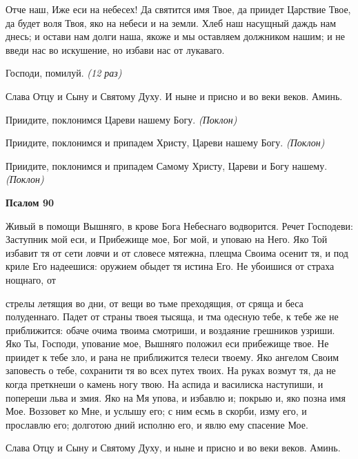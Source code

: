    Отче наш, Иже еси на небесех! Да святится имя Твое, да приидет
Царствие Твое, да будет воля Твоя, яко на небеси и на земли. Хлеб наш
насущный даждь нам днесь; и остави нам долги наша, якоже и мы оставляем
должником нашим; и не введи нас во искушение, но избави нас от
лукаваго.



   Господи, помилуй. \itshape (12 раз)\normalfont{}



   Слава Отцу и Сыну и Святому Духу. И ныне и присно и во веки веков.
Аминь.



   Приидите, поклонимся Цареви нашему Богу. \itshape (Поклон)\normalfont{}



   Приидите, поклонимся и припадем Христу, Цареви нашему Богу.
\itshape (Поклон)\normalfont{}



   Приидите, поклонимся и припадем Самому Христу, Цареви и Богу
нашему. \itshape (Поклон)\normalfont{}



 

\bfseries Псалом 90\normalfont{}


   Живый в помощи Вышняго, в крове Бога Небеснаго водворится.
Речет Господеви: Заступник мой еси, и Прибежище мое, Бог мой,
и уповаю на Него. Яко Той избавит тя от сети ловчи и от словесе
мятежна, плещма Своима осенит тя, и под криле Его надеешися:
оружием обыдет тя истина Его. Не убоишися от страха нощнаго, от

стрелы летящия во дни, от вещи во тьме преходящия, от сряща и беса
полуденнаго. Падет от страны твоея тысяща, и тма одесную тебе, к
тебе же не приближится: обаче очима твоима смотриши, и воздаяние
грешников узриши. Яко Ты, Господи, упование мое, Вышняго положил еси
прибежище твое. Не приидет к тебе зло, и рана не приближится телеси
твоему. Яко ангелом Своим заповесть о тебе, сохранити тя во всех
путех твоих. На руках возмут тя, да не когда преткнеши о камень
ногу твою. На аспида и василиска наступиши, и попереши льва и
змия. Яко на Мя упова, и избавлю и; покрыю и, яко позна имя Мое.
Воззовет ко Мне, и услышу его; с ним есмь в скорби, изму его, и
прославлю его; долготою дний исполню его, и явлю ему спасение
Мое.



   Слава Отцу и Сыну и Святому Духу, и ныне и присно и во веки веков.
Аминь.



